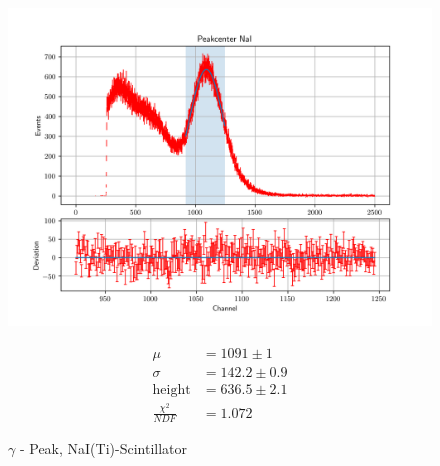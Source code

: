 \documentclass[12pt,twoside,a4paper]{scrartcl}
\begin{document}
			\begin{figure}[H]
				\centering
					\begin{minipage}{0.69 \textwidth}
						\includegraphics[width = \textwidth]{Plots/Scinti/PeakNaIBest.png}
					\end{minipage}
					\begin{minipage}{0.29 \textwidth}
						\begin{align*}
							\mu &= 1091 \pm 1 \\
							\sigma &= 142.2 \pm 0.9 \\
                            \text{height} &= 636.5 \pm 2.1 \\
							\frac{\chi^2}{NDF} &= 1.072
						\end{align*}
					\end{minipage}
                    \caption{$\gamma$ - Peak, NaI(Ti)-Scintillator}
				\end{figure}
\end{document}
